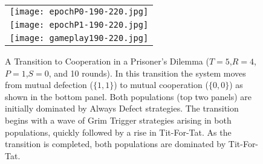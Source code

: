 \documentclass[12pt]{book}
\begin{document}
\begin{figure}[!htbp]
\centering
\begin{tabular}{c}
\texttt{[image: epochP0-190-220.jpg]} \\
\texttt{[image: epochP1-190-220.jpg]} \\
\texttt{[image: gameplay190-220.jpg]} \\
\end{tabular}
\caption[A Transiton to Cooperation]{A Transition to Cooperation in a Prisoner's
Dilemma ($T=5$,$R=4$,$P=1$,$S=0$, and 10 rounds).
In this transition the system moves from mutual defection ($\{1,1\}$) to
mutual cooperation ($\{0,0\}$) as shown in the bottom panel.  Both populations
(top two panels)
are initially dominated by Always Defect strategies.  The transition begins with
a wave of Grim Trigger strategies arising in both populations, quickly followed by a rise in Tit-For-Tat.  As the transition is completed, both populations are
dominated by Tit-For-Tat.
}
\label{fgpdtrans}
\end{figure}
\end{document}
